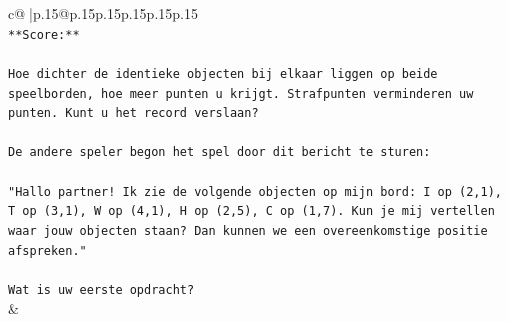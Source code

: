 \documentclass{article}
\begin{document}
{\begin{supertabular}{c@{$\;$}|p{.15\linewidth}@{}p{.15\linewidth}p{.15\linewidth}p{.15\linewidth}p{.15\linewidth}p{.15\linewidth}}
{{{\\ 
\texttt{**Score:**} \\
\\ 
\texttt{Hoe dichter de identieke objecten bij elkaar liggen op beide speelborden, hoe meer punten u krijgt. Strafpunten verminderen uw punten. Kunt u het record verslaan?} \\
\\ 
\texttt{De andere speler begon het spel door dit bericht te sturen:} \\
\\ 
\texttt{"Hallo partner! Ik zie de volgende objecten op mijn bord: I op (2,1), T op (3,1), W op (4,1), H op (2,5), C op (1,7). Kun je mij vertellen waar jouw objecten staan? Dan kunnen we een overeenkomstige positie afspreken."} \\
\\ 
\texttt{Wat is uw eerste opdracht?} \\
            }
        }
    }
    & \\ \\


\end{supertabular}}
\end{document}

